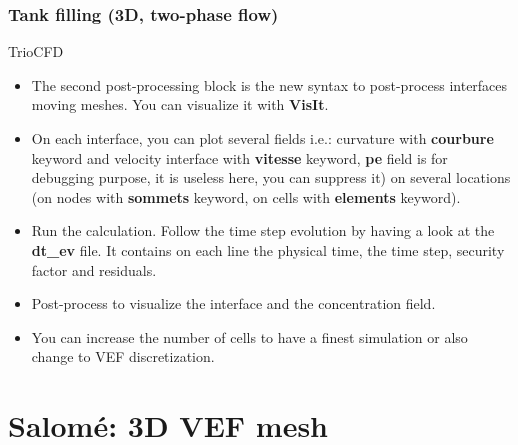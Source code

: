 \documentclass[10pt, hyperref={unicode=true,pdfusetitle, bookmarks=true,bookmarksnumbered=false,bookmarksopen=false, breaklinks=false,pdfborder={0 0l 1},backref=true,colorlinks=true,linkcolor=darkblue,pageanchor}]{beamer}
\begin{document}
\begin{frame}
\frametitle{Tank filling (3D, two-phase flow)}
\begin{block}{TrioCFD}

\begin{itemize}
\item The second post-processing block is the new syntax to post-process interfaces moving meshes. You can visualize it with \textbf{VisIt}. 

\item On each interface, you can plot several fields i.e.: curvature with \textbf{courbure} keyword and velocity interface with \textbf{vitesse} keyword, \textbf{pe} field is for debugging purpose, it is useless here, you can suppress it) on several locations (on nodes with \textbf{sommets} keyword, on cells with \textbf{elements} keyword).

\item Run the calculation. Follow the time step evolution by having a look at the \textbf{dt\_ev} file. It contains on each line the physical time, the time step, security factor and residuals.

\item Post-process to visualize the interface and the concentration field.

\item You can increase the number of cells to have a finest simulation or also change to VEF discretization.

\end{itemize}

\end{block}
\end{frame}



\section{{\bf{Salom\'e: 3D VEF mesh}}} \label{salome}
\end{document}
